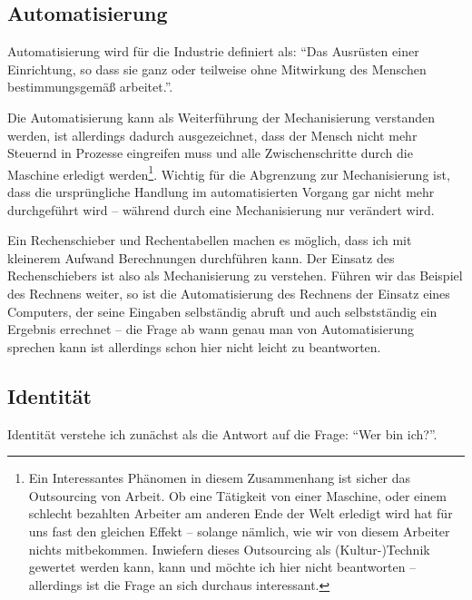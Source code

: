 \subsection {Automatisierung}

Automatisierung wird für die Industrie definiert als: \enquote{Das Ausrüsten einer Einrichtung, so dass sie ganz oder teilweise ohne Mitwirkung des Menschen bestimmungsgemäß arbeitet.}\parencite{din19233}.

Die Automatisierung kann als Weiterführung der Mechanisierung verstanden werden\parencite{ulrich}, ist allerdings dadurch ausgezeichnet, dass der Mensch nicht mehr Steuernd in Prozesse eingreifen muss und alle Zwischenschritte durch die Maschine erledigt werden\footnote{Ein Interessantes Phänomen in diesem Zusammenhang ist sicher das Outsourcing von Arbeit. Ob eine Tätigkeit von einer Maschine, oder einem schlecht bezahlten Arbeiter am anderen Ende der Welt erledigt wird hat für uns fast den gleichen Effekt – solange nämlich, wie wir von diesem Arbeiter nichts mitbekommen. Inwiefern dieses Outsourcing als (Kultur-)Technik gewertet werden kann, kann und möchte ich hier nicht beantworten – allerdings ist die Frage an sich durchaus interessant.}.
Wichtig für die Abgrenzung zur Mechanisierung ist, dass die ursprüngliche Handlung im automatisierten Vorgang gar nicht mehr durchgeführt wird – während durch eine Mechanisierung nur verändert wird.

Ein Rechenschieber und Rechentabellen machen es möglich, dass ich mit kleinerem Aufwand Berechnungen durchführen kann.
Der Einsatz des Rechenschiebers ist also als Mechanisierung zu verstehen.
Führen wir das Beispiel des Rechnens weiter, so ist die Automatisierung des Rechnens der Einsatz eines Computers, der seine Eingaben selbständig abruft und auch selbstständig ein Ergebnis errechnet – die Frage ab wann genau man von Automatisierung sprechen kann ist allerdings schon hier nicht leicht zu beantworten.

\subsection {Identität}
Identität verstehe ich zunächst als die Antwort auf die Frage: \enquote{Wer bin ich?}.

